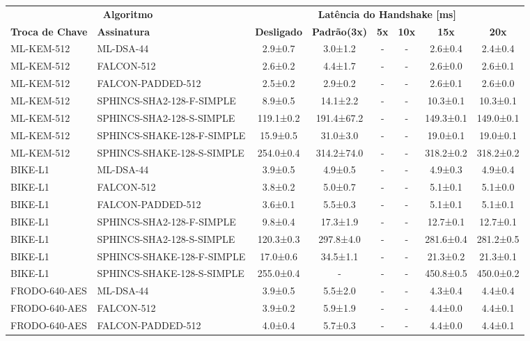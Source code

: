 \documentclass[10pt]{article}
\begin{document}
\centering
\small
\begin{tabular}{@{}l l c c c c c c@{}}
\toprule
\multicolumn{2}{c}{\textbf{Algoritmo}} & \multicolumn{6}{c}{\textbf{Latência do Handshake [ms]}} \\
\cmidrule(lr){1-2}\cmidrule(lr){3-8}
\textbf{Troca de Chave} & \textbf{Assinatura} & \textbf{Desligado} & \textbf{Padrão(3x)} & \textbf{5x} & \textbf{10x} & \textbf{15x} & \textbf{20x} \\
\midrule
ML-KEM-512 & ML-DSA-44 & 2.9±0.7 & 3.0±1.2 & - & - & 2.6±0.4 & 2.4±0.4 \\
ML-KEM-512 & FALCON-512 & 2.6±0.2 & 4.4±1.7 & - & - & 2.6±0.0 & 2.6±0.1 \\
ML-KEM-512 & FALCON-PADDED-512 & 2.5±0.2 & 2.9±0.2 & - & - & 2.6±0.1 & 2.6±0.0 \\
ML-KEM-512 & SPHINCS-SHA2-128-F-SIMPLE & 8.9±0.5 & 14.1±2.2 & - & - & 10.3±0.1 & 10.3±0.1 \\
ML-KEM-512 & SPHINCS-SHA2-128-S-SIMPLE & 119.1±0.2 & 191.4±67.2 & - & - & 149.3±0.1 & 149.0±0.1 \\
ML-KEM-512 & SPHINCS-SHAKE-128-F-SIMPLE & 15.9±0.5 & 31.0±3.0 & - & - & 19.0±0.1 & 19.0±0.1 \\
ML-KEM-512 & SPHINCS-SHAKE-128-S-SIMPLE & 254.0±0.4 & 314.2±74.0 & - & - & 318.2±0.2 & 318.2±0.2 \\
BIKE-L1 & ML-DSA-44 & 3.9±0.5 & 4.9±0.5 & - & - & 4.9±0.3 & 4.9±0.4 \\
BIKE-L1 & FALCON-512 & 3.8±0.2 & 5.0±0.7 & - & - & 5.1±0.1 & 5.1±0.0 \\
BIKE-L1 & FALCON-PADDED-512 & 3.6±0.1 & 5.5±0.3 & - & - & 5.1±0.1 & 5.1±0.1 \\
BIKE-L1 & SPHINCS-SHA2-128-F-SIMPLE & 9.8±0.4 & 17.3±1.9 & - & - & 12.7±0.1 & 12.7±0.1 \\
BIKE-L1 & SPHINCS-SHA2-128-S-SIMPLE & 120.3±0.3 & 297.8±4.0 & - & - & 281.6±0.4 & 281.2±0.5 \\
BIKE-L1 & SPHINCS-SHAKE-128-F-SIMPLE & 17.0±0.6 & 34.5±1.1 & - & - & 21.3±0.2 & 21.3±0.1 \\
BIKE-L1 & SPHINCS-SHAKE-128-S-SIMPLE & 255.0±0.4 & - & - & - & 450.8±0.5 & 450.0±0.2 \\
FRODO-640-AES & ML-DSA-44 & 3.9±0.5 & 5.5±2.0 & - & - & 4.3±0.4 & 4.4±0.4 \\
FRODO-640-AES & FALCON-512 & 3.9±0.2 & 5.9±1.9 & - & - & 4.4±0.0 & 4.4±0.1 \\
FRODO-640-AES & FALCON-PADDED-512 & 4.0±0.4 & 5.7±0.3 & - & - & 4.4±0.0 & 4.4±0.1 \\

\end{tabular}
\end{document}
